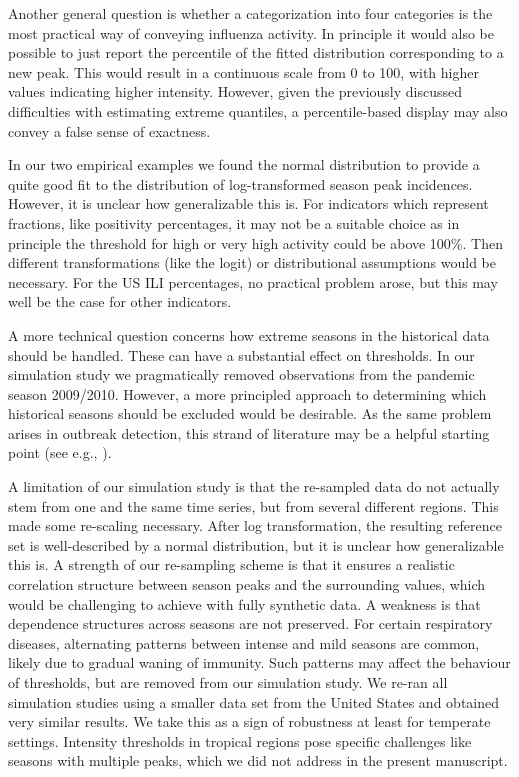 \documentclass{article}
\begin{document}
Another general question is whether a categorization into four categories is the most practical way of conveying influenza activity. In principle it would also be possible to just report the percentile of the fitted distribution corresponding to a new peak. This would result in a continuous scale from 0 to 100, with higher values indicating higher intensity. However, given the previously discussed difficulties with estimating extreme quantiles, a percentile-based display may also convey a false sense of exactness.

In our two empirical examples we found the normal distribution to provide a quite good fit to the distribution of log-transformed season peak incidences. However, it is unclear how generalizable this is. For indicators which represent fractions, like positivity percentages, it may not be a suitable choice as in principle the threshold for high or very high activity could be above 100\%. Then different transformations (like the logit) or distributional assumptions would be necessary. For the US ILI percentages, no practical problem arose, but this may well be the case for other indicators.

A more technical question concerns how extreme seasons in the historical data should be handled. These can have a substantial effect on thresholds. In our simulation study we pragmatically removed observations from the pandemic season 2009/2010. However, a more principled approach to determining which historical seasons should be excluded would be desirable. As the same problem arises in outbreak detection, this strand of literature may be a helpful starting point (see e.g., \citealt{Noufaily2013}).



A limitation of our simulation study is that the re-sampled data do not actually stem from one and the same time series, but from several different regions. This made some re-scaling necessary. After log transformation, the resulting reference set is well-described by a normal distribution, but it is unclear how generalizable this is. A strength of our re-sampling scheme is that it ensures a realistic correlation structure between season peaks and the surrounding values, which would be challenging to achieve with fully synthetic data. A weakness is that dependence structures across seasons are not preserved. For certain respiratory diseases, alternating patterns between intense and mild seasons are common, likely due to gradual waning of immunity. Such patterns may affect the behaviour of thresholds, but are removed from our simulation study. We re-ran all simulation studies using a smaller data set from the United States and obtained very similar results. We take this as a sign of robustness at least for temperate settings. Intensity thresholds in tropical regions pose specific challenges like seasons with multiple peaks, which we did not address in the present manuscript.
\end{document}

